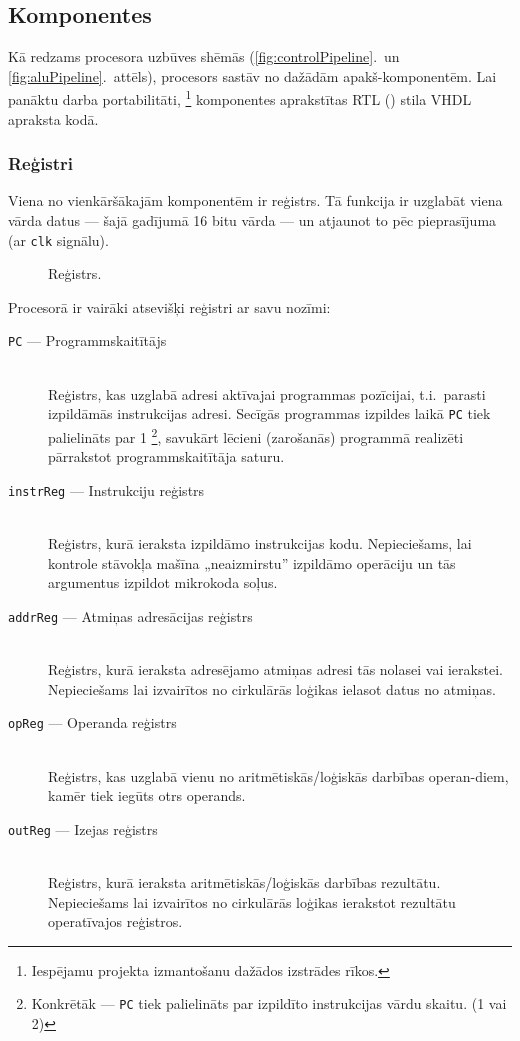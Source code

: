 \subsection{Komponentes}
Kā redzams procesora uzbūves shēmās
(\ref{fig:controlPipeline}.~un \ref{fig:aluPipeline}.~attēls), procesors
sastāv no dažādām apakš-komponentēm. Lai panāktu darba portabilitāti,%
\footnote{Iespējamu projekta izmantošanu dažādos izstrādes rīkos.}
komponentes aprakstītas RTL () stila
VHDL apraksta kodā.

\subsubsection{Reģistri}
	Viena no vienkāršākajām komponentēm ir reģistrs. Tā funkcija ir uzglabāt
	viena vārda datus — šajā gadījumā 16 bitu vārda — un atjaunot to pēc
	pieprasījuma (ar \texttt{clk} signālu).
	
	\begin{figure}[bh]
		\centering
		\def\svgscale{1.25}
		{\ttfamily\scriptsize}
		\caption{Reģistrs.}
		\label{fig:reg}
	\end{figure}
	
	\noindent Procesorā ir vairāki atsevišķi reģistri ar savu nozīmi:
	\begin{description}
		\item[\texttt{PC} — Programmskaitītājs] \hfill \\
			Reģistrs, kas uzglabā adresi aktīvajai programmas pozīcijai,
			t.i.~parasti izpildāmās instrukcijas adresi. Secīgās programmas
			izpildes laikā \texttt{PC} tiek palielināts par 1%
			\footnote{Konkrētāk — \texttt{PC} tiek palielināts par
				izpildīto instrukcijas vārdu skaitu. (1 vai 2)},
			savukārt lēcieni (zarošanās)
			programmā realizēti pārrakstot programmskaitītāja saturu.
		\item[\texttt{instrReg} — Instrukciju reģistrs] \hfill \\
			Reģistrs, kurā ieraksta izpildāmo instrukcijas kodu.
			Nepieciešams, lai kontrole stāvokļa mašīna „neaizmirstu”
			izpildāmo operāciju un tās argumentus izpildot mikrokoda soļus.
		\item[\texttt{addrReg} — Atmiņas adresācijas reģistrs] \hfill \\
			Reģistrs, kurā ieraksta adresējamo atmiņas adresi tās nolasei
			vai ierakstei. Nepieciešams lai izvairītos no
			cirkulārās loģikas ielasot datus no atmiņas.
		\item[\texttt{opReg} — Operanda reģistrs] \hfill \\
			Reģistrs, kas uzglabā vienu no aritmētiskās/loģiskās darbības
			ope\-ran-diem, kamēr tiek iegūts otrs operands.
		\item[\texttt{outReg} — Izejas reģistrs] \hfill \\
			Reģistrs, kurā ieraksta aritmētiskās/loģiskās darbības rezultātu.
			Nepieciešams lai izvairītos no cirkulārās loģikas
			ierakstot rezultātu operatīvajos reģistros.
	\end{description}
	
